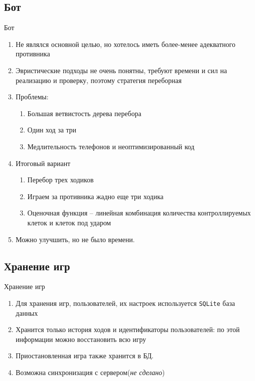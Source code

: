 \documentclass{beamer}
\def\t{\texttt}
\begin{document}
\subsection{Бот}
\begin{frame}[t]{Бот}
    \begin{enumerate}
    \item
        Не являлся основной целью, но хотелось иметь более-менее адекватного противника
    \pause
    \item
        Эвристические подходы не очень понятны, требуют времени и сил на реализацию и проверку, поэтому стратегия переборная

    \pause
    \item
        Проблемы:
        \begin{enumerate}
            \item
                Большая ветвистость дерева перебора
            \item
                Один ход за три
            \item
                Медлительность телефонов и неоптимизированный код         
        \end{enumerate}        
    \pause
    \item
        Итоговый вариант
        \begin{enumerate}
            \item
                Перебор трех ходиков
            \item
                Играем за противника жадно еще три ходика
            \item
                Оценочная функция -- линейная комбинация количества контроллируемых клеток и клеток под ударом
        \end{enumerate}        
    \pause
    \item
        Можно улучшить, но не было времени.
    \end{enumerate}
\end{frame}

\subsection{Хранение игр}
\begin{frame}[t]{Хранение игр}
    \begin{enumerate}
        \item
            Для хранения игр, пользователей, их настроек используется \t{SQLite} база данных
        \pause
        \item
            Хранится только история ходов и идентификаторы пользователей: по этой информации можно восстановить всю игру
        \pause
        \item
            Приостановленная игра также хранится в БД.
        \pause
        \item
            Возможна синхронизация с сервером(\textit{не сделано})
    \end{enumerate}
\end{frame}
\end{document}
